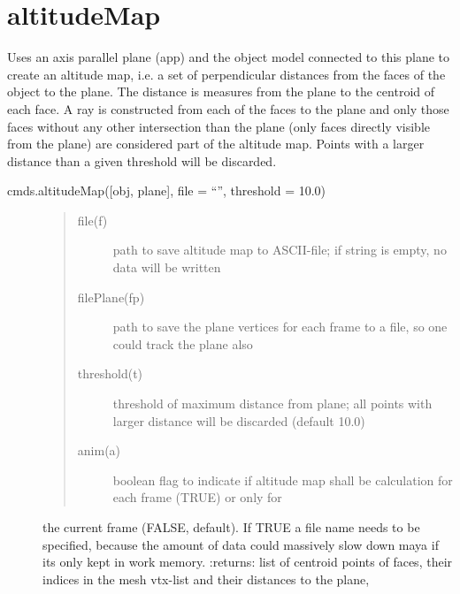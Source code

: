 \documentclass[letterpaper,10pt,english]{sphinxmanual}
\begin{document}
\section{altitudeMap}
\label{\detokenize{pk_src.altitudeMap:altitudemap}}\label{\detokenize{pk_src.altitudeMap::doc}}\label{\detokenize{pk_src.altitudeMap:id1}}
{\hyperref[\detokenize{index:commands}]{}}
\label{\detokenize{pk_src.altitudeMap:module-pk_src.altitudeMap}}
Uses an axis parallel plane (app) and the object model connected to this plane to create an altitude map,
i.e. a set of perpendicular distances from the faces of the object to the plane. The distance is measures from the
plane to the centroid of each face. A ray is constructed from each of the faces to the plane and only those faces
without any other intersection than the plane (only faces directly visible from the plane) are considered part of
the altitude map.
Points with a larger distance than a given threshold will be discarded.

 {\hyperref[\detokenize{pk_src.axisParallelPlane:axisparallelplane}]{}}

 cmds.altitudeMap({[}obj, plane{]}, file = “”, threshold = 10.0)
\begin{description}
\item[{}] \leavevmode\begin{quote}\begin{description}
\item[{file(f)}] \leavevmode
path to save altitude map to ASCII-file; if string is empty, no data will be written

\item[{filePlane(fp)}] \leavevmode
path to save the plane vertices for each frame to a file, so one could track the plane also

\item[{threshold(t)}] \leavevmode
threshold of maximum distance from plane; all points with larger distance will be discarded (default 10.0)

\item[{anim(a)}] \leavevmode
boolean flag to indicate if altitude map shall be calculation for each frame (TRUE) or only for

\end{description}\end{quote}

the current frame (FALSE, default). If TRUE a file name needs to be specified, because the amount of data
could massively slow down maya if its only kept in work memory.
:returns: list of centroid points of faces, their indices in the mesh vtx-list and their distances to the plane,

\end{description}
\end{document}
